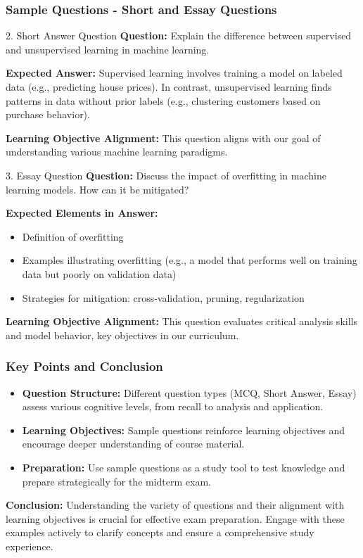 \documentclass[aspectratio=169]{beamer}
\begin{document}
\begin{frame}[fragile]
    \frametitle{Sample Questions - Short and Essay Questions}
    \begin{block}{2. Short Answer Question}
        \textbf{Question:} Explain the difference between supervised and unsupervised learning in machine learning.
        
        \textbf{Expected Answer:}
        Supervised learning involves training a model on labeled data (e.g., predicting house prices). In contrast, unsupervised learning finds patterns in data without prior labels (e.g., clustering customers based on purchase behavior).

        \textbf{Learning Objective Alignment:} This question aligns with our goal of understanding various machine learning paradigms.
    \end{block}

    \begin{block}{3. Essay Question}
        \textbf{Question:} Discuss the impact of overfitting in machine learning models. How can it be mitigated?
        
        \textbf{Expected Elements in Answer:}
        \begin{itemize}
            \item Definition of overfitting
            \item Examples illustrating overfitting (e.g., a model that performs well on training data but poorly on validation data)
            \item Strategies for mitigation: cross-validation, pruning, regularization
        \end{itemize}
        
        \textbf{Learning Objective Alignment:} This question evaluates critical analysis skills and model behavior, key objectives in our curriculum.
    \end{block}
\end{frame}

\begin{frame}[fragile]
    \frametitle{Key Points and Conclusion}
    \begin{itemize}
        \item \textbf{Question Structure:} Different question types (MCQ, Short Answer, Essay) assess various cognitive levels, from recall to analysis and application.
        \item \textbf{Learning Objectives:} Sample questions reinforce learning objectives and encourage deeper understanding of course material.
        \item \textbf{Preparation:} Use sample questions as a study tool to test knowledge and prepare strategically for the midterm exam.
    \end{itemize}

    \textbf{Conclusion:} Understanding the variety of questions and their alignment with learning objectives is crucial for effective exam preparation. Engage with these examples actively to clarify concepts and ensure a comprehensive study experience.
\end{frame}
\end{document}
